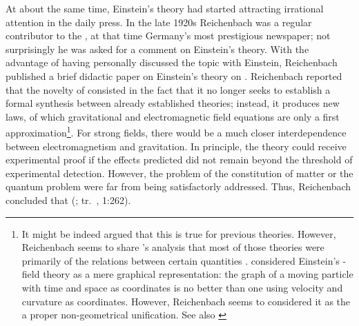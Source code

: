 \documentclass[draft]{article}
\newcommand{\FP}{\german{Fernparallelismus}\xspace}
\newcommand{\vza}[1]{(\cite{Reichenbach1929c}; tr.\ \citeyear{Reichenbach1978}, 1:#1)\xspace}
\begin{document}

At about the same time, Einstein's theory had started attracting irrational attention in the daily press. In the late 1920s Reichenbach was a regular contributor to the , at that time Germany's most prestigious newspaper; not surprisingly he was asked for a comment on Einstein's theory. With the advantage of having personally discussed the topic with Einstein, Reichenbach published a brief didactic paper on Einstein's theory on  \citep{Reichenbach1929c}.   Reichenbach reported that the novelty of \FP consisted in the fact that it no longer seeks to establish a formal synthesis between already established theories; instead, it produces new laws, of which gravitational and electromagnetic field equations are only a first approximation\footnote{It might be indeed argued that this is true for previous theories. However, Reichenbach seems to share \citet[84]{Eddington1923}'s analysis that most of those theories were primarily  of the relations between certain quantities \citep[\S15 and \S50]{Reichenbach1928a}. \citet[281]{Eddington1929} considered Einstein's \FP-field theory as a mere graphical representation: the graph of a moving particle with time and space as coordinates is no better than one using velocity and curvature as coordinates. However, Reichenbach seems to considered it as the a proper non-geometrical unification. See also \cite[121f.]{Goldstein2003}}. For strong fields, there would be a much closer interdependence between electromagnetism and gravitation. In principle, the theory could receive experimental proof if the effects predicted did not remain beyond the threshold of experimental detection. However, the problem of the constitution of matter or the quantum problem were far from being satisfactorly addressed. Thus, Reichenbach concluded that  \vza{262}. 
\end{document}
